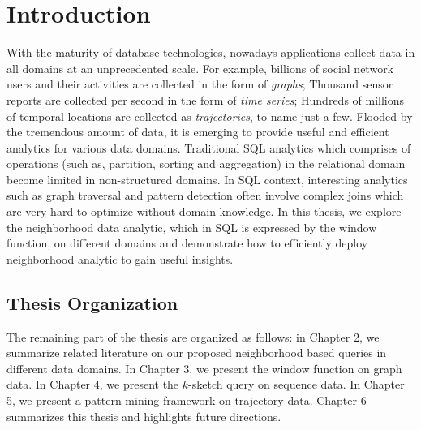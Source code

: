 \chapter{Introduction}
With the maturity of database technologies, nowadays
applications collect data in all domains at an
unprecedented scale. For example, billions of 
social network users and their activities are collected in the form
of \emph{graphs}; Thousand sensor reports are collected per second
in the form of \emph{time series}; Hundreds of millions of temporal-locations
are collected as \emph{trajectories}, to name just a few. Flooded by the
tremendous amount of data, it is emerging to 
provide useful and efficient analytics for various data domains.
Traditional SQL analytics which comprises 
of operations (such as, partition, sorting and aggregation) in the relational domain
become limited in non-structured domains.
In SQL context, interesting analytics such as graph traversal and pattern detection
often involve complex joins which are very hard to optimize 
without domain knowledge.
In this thesis, we explore the neighborhood data analytic, which
in SQL is expressed by the window function,
on different domains and demonstrate how to efficiently deploy
neighborhood analytic to gain useful insights.






\section{Thesis Organization}
The remaining part of the thesis are organized as follows: in Chapter 2, we summarize related literature on our
proposed neighborhood based queries in different data domains. In Chapter 3, we present the window function on graph data. In Chapter 4, we present the $k$-sketch query on sequence data.
In Chapter 5, we present a pattern mining framework on trajectory data. 
Chapter 6 summarizes this thesis and highlights future directions.
